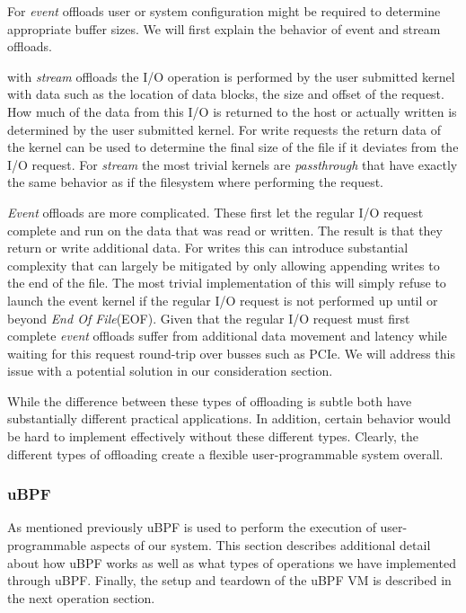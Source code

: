 For \textit{event} offloads user or system configuration might be required to
determine appropriate buffer sizes. We will first explain the behavior of event
and stream offloads.

with \textit{stream} offloads the I/O operation is performed by the user
submitted kernel with data such as the location of data blocks, the size and
offset of the request. How much of the data from this I/O is returned to the
host or actually written is determined by the user submitted kernel. For write
requests the return data of the kernel can be used to determine the final size
of the file if it deviates from the I/O request. For \textit{stream} the most
trivial kernels are \textit{passthrough} that have exactly the same behavior as
if the filesystem where performing the request.

\textit{Event} offloads are more complicated. These first let the regular I/O
request complete and run on the data that was read or written. The result is
that they return or write additional data. For writes this can introduce
substantial complexity that can largely be mitigated by only allowing appending
writes to the end of the file. The most trivial implementation of this will
simply refuse to launch the event kernel if the regular I/O request is not
performed up until or beyond \textit{End Of File}(EOF). Given that the regular
I/O request must first complete \textit{event} offloads suffer from additional
data movement and latency while waiting for this request round-trip over busses
such as PCIe. We will address this issue with a potential solution in our
consideration section.

While the difference between these types of offloading is subtle both have
substantially different practical applications. In addition, certain behavior
would be hard to implement effectively without these different types. Clearly,
the different types of offloading create a flexible user-programmable system
overall.

\subsubsection{uBPF}

As mentioned previously uBPF \cite{ubpf} is used to perform the execution of
user-programmable aspects of our system. This section describes additional
detail about how uBPF works as well as what types of operations we have
implemented through uBPF. Finally, the setup and teardown of the uBPF VM is
described in the next operation section.

